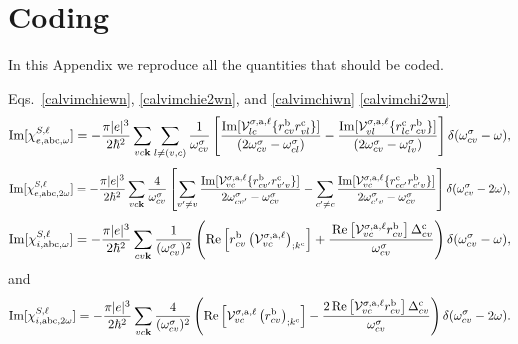 \section{Coding}\label{code}
In this Appendix we reproduce all the quantities  that should be coded.

Eqs.~\eqref{calvimchiewn}, \eqref{calvimchie2wn}, and \eqref{calvimchiwn}
\eqref{calvimchi2wn}
\begin{align}\label{c-calvimchiewn}
\mathrm{Im}[\chi_{e,\mathrm{a}\mathrm{b}\mathrm{c},\omega}^{S,\ell}] =
-\frac{\pi |e|^3}{2\hbar^2}\sum_{vc\mathbf{k}}\sum_{l\neq(v,c)}\frac{1}{\omega^{\sigma}_{cv}}
\left[
\frac{\mathrm{Im}[\mathcal{V}^{\sigma,\text{a},\ell}_{lc}\{r^{\mathrm{b}}_{cv}r^{\mathrm{c}}_{vl}\}]}
{(2\omega^\sigma_{cv}-\omega^\sigma_{cl})} 
-\frac{\mathrm{Im}[\mathcal{V}^{\sigma,\text{a},\ell}_{vl}\{r^{\mathrm{c}}_{lc}r^{\mathrm{b}}_{cv}\}]}
{(2\omega^\sigma_{cv}-\omega^\sigma_{lv})}
\right]\delta(\omega^\sigma_{cv}-\omega),
\end{align}  
\begin{align}\label{c-calvimchie2wn}
\mathrm{Im}[\chi_{e,\mathrm{a}\mathrm{b}\mathrm{c},2\omega}^{S,\ell}] =
-\frac{\pi |e|^3}{2\hbar^2}\sum_{vc\mathbf{k}}\frac{4}{\omega^{\sigma}_{cv}}
\left[
\sum_{v'\ne
  v}\frac{\mathrm{Im}[\mathcal{V}^{\sigma,\text{a},\ell}_{vc}\{r^{\mathrm{b}}_{cv'}r^{\mathrm{c}}_{v'v}\}]}
{2\omega^\sigma_{cv'}-\omega^\sigma_{cv}}
- \sum_{c'\ne
  c}\frac{\mathrm{Im}[\mathcal{V}^{\sigma,\text{a},\ell}_{vc}\{r^{\mathrm{c}}_{cc'}r^{\mathrm{b}}_{c'v}\}]}
{2\omega^\sigma_{c'v}-\omega^\sigma_{cv}}
\right]\delta(\omega^\sigma_{cv}-2\omega),
\end{align}
\begin{align}\label{c-calvimchiwn}
\mathrm{Im}[\chi_{i,\text{a}\text{b}\text{c},\omega}^{S,\ell}]
= -\frac{\pi\vert e\vert^3}{2\hbar^2}\sum_{cv\mathbf{k}}\frac{1}{(\omega^{\sigma}_{cv})^{2}}
\left(
\mathrm{Re}\left[r^{\text{b}}_{cv}\left(\mathcal{V}^{\sigma,\text{a},\ell}_{vc}\right)_{;k^{\text{c}}}\right]
+\frac{\,\mathrm{Re}\left[\mathcal{V}^{\sigma,\text{a},\ell}_{vc}r^{\text{b}}_{cv}\right]
\Delta^{\text{c}}_{cv}}{\omega^{\sigma}_{cv}} 
\right)\delta(\omega^{\sigma}_{cv}-\omega),
\end{align}
and
\begin{align}\label{c-calvimchi2wn}
\mathrm{Im}[\chi_{i,\text{a}\text{b}\text{c},2\omega}^{S,\ell}] 
=
 -\frac{\pi \vert
   e\vert^{3}}{2\hbar^2}\sum_{vc\mathbf{k}}\frac{4}{(\omega^{\sigma}_{cv})^{2}}
\left(\mathrm{Re}\left[\mathcal{V}^{\sigma,\text{a},\ell}_{vc}\left(r^{\text{b}}_{cv}\right)_{;k^{\text{c}}}
\right] -
\frac{2\,\mathrm{Re}\left[\mathcal{V}^{\sigma,\text{a},\ell}_{vc}r^{\text{b}}_{cv}\right]
\Delta^{\text{c}}_{cv}}{\omega^{\sigma}_{cv}}\right)\delta(\omega^{\sigma}_{cv}-2\omega).
\end{align}
